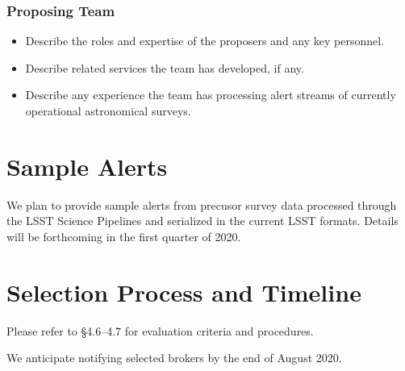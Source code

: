 \documentclass[DM,toc,lsstdraft]{lsstdoc}
\begin{document}
\subsubsection{Proposing Team}

\begin{itemize}
\item Describe the roles and expertise of the proposers and any key personnel.
\item Describe related services the team has developed, if any.
\item Describe any experience the team has processing alert streams of currently operational astronomical surveys. 
\end{itemize}


\section{Sample Alerts}

We plan to provide sample alerts from precusor survey data processed through the LSST Science Pipelines and serialized in the current LSST formats.
Details will be forthcoming in the first quarter of 2020.

\section{Selection Process and Timeline}

Please refer to  \S4.6--4.7 for evaluation criteria and procedures.

We anticipate notifying selected brokers by the end of August 2020.

%


\end{document}
